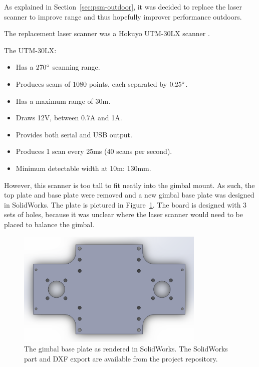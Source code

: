 \documentclass[12pt,oneside,a4paper]{book}
\begin{document}
As explained in Section~\ref{sec:psm-outdoor}, it was decided to
replace the laser scanner to improve range and thus hopefully improver
performance outdoors.

The replacement laser scanner was a Hokuyo UTM-30LX scanner
\cite{scanner2}. 

The UTM-30LX:
\begin{itemize}
\item Has a $270\degree$ scanning range.
\item Produces scans of 1080 points, each separated by $0.25\degree$.
\item Has a maximum range of 30m.
\item Draws 12V, between 0.7A and 1A.
\item Provides both serial and USB output.
\item Produces 1 scan every 25ms (40 scans per second).
\item Minimum detectable width at 10m: 130mm.
\end{itemize}

However, this scanner is too tall to fit neatly into the gimbal
mount. As such, the top plate and base plate were removed and a new
gimbal base plate was designed in SolidWorks. The plate is pictured in
Figure~\ref{fig:baseplate}. The board is designed with 3 sets of
holes, because it was unclear where the laser scanner would need to be
placed to balance the gimbal.

\begin{figure}[h]
  \centering
  \includegraphics[width=0.8\textwidth]{figs/baseplate}
  \caption{The gimbal base plate as rendered in SolidWorks. The SolidWorks part and DXF export are available from the project repository.}
  \label{fig:baseplate}
\end{figure}
\end{document}
